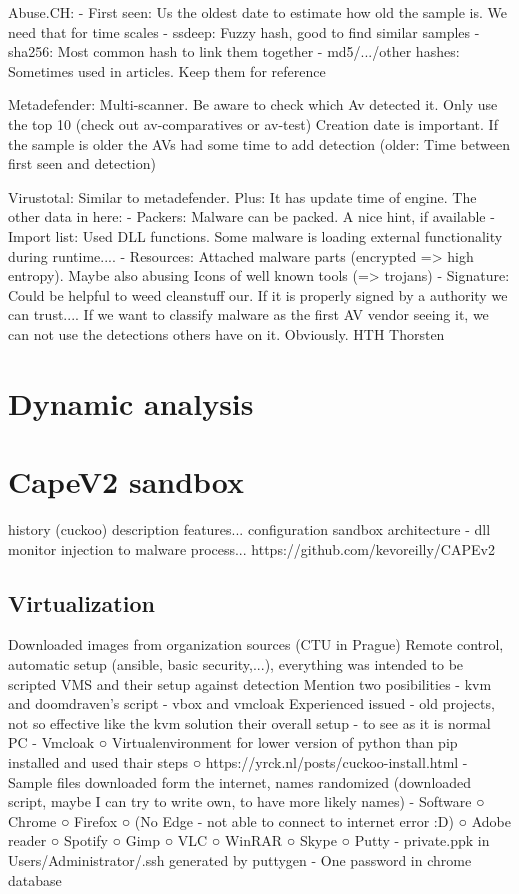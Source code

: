 Abuse.CH:
- First seen: Us the oldest date to estimate how old the sample is. We need that for time scales
- ssdeep: Fuzzy hash, good to find similar samples
- sha256: Most common hash to link them together
- md5/.../other hashes: Sometimes used in articles. Keep them for reference

Metadefender:
Multi-scanner. Be aware to check which Av detected it. Only use the top 10 (check out av-comparatives or av-test)
Creation date is important. If the sample is older the AVs had some time to add detection (older: Time between first seen and detection)


Virustotal:
Similar to metadefender. Plus: It has update time of engine.
The other data in here:
- Packers: Malware can be packed. A nice hint, if available
- Import list: Used DLL functions. Some malware is loading external functionality during runtime....
- Resources: Attached malware parts (encrypted => high entropy). Maybe also abusing Icons of well known tools (=> trojans)
- Signature: Could be helpful to weed cleanstuff our. If it is properly signed by a authority we can trust....
If we want to classify malware as the first AV vendor seeing it, we can not use the detections others have on it. Obviously.
HTH
Thorsten

\section{Dynamic analysis}
\section{CapeV2 sandbox}
history (cuckoo)
description
    features...
configuration
sandbox architecture - dll monitor injection to malware process...
https://github.com/kevoreilly/CAPEv2

\subsection{Virtualization}
Downloaded images from organization sources (CTU in Prague)
Remote control, automatic setup (ansible, basic security,...), everything was intended to be scripted
VMS and their setup against detection
Mention two posibilities
    - kvm and doomdraven's script
    - vbox and vmcloak
        Experienced issued - old projects, not so effective like the kvm solution
their overall setup - to see as it is normal PC
    - Vmcloak
    ○ Virtualenvironment for lower version of python than pip installed and used thair steps
    ○ https://yrck.nl/posts/cuckoo-install.html
    - Sample files downloaded form the internet, names randomized (downloaded script, maybe I can try to write own, to have more likely names)
    - Software
    ○ Chrome
    ○ Firefox
    ○ (No Edge - not able to connect to internet error :D)
    ○ Adobe reader
    ○ Spotify
    ○ Gimp
    ○ VLC
    ○ WinRAR
    ○ Skype
    ○ Putty
    - private.ppk in Users/Administrator/.ssh generated by puttygen
    - One password in chrome database

